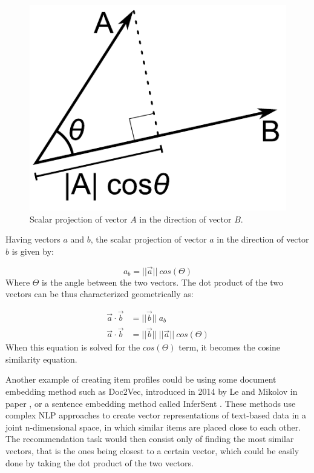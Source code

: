\begin{figure}[H]
    \centering
    \includegraphics[scale=0.8]{obrazky-figures/dot_product.pdf}
    \caption{Scalar projection of vector $A$ in the direction of vector $B$.}
    \label{scalar_projection}
\end{figure}

Having vectors $a$ and $b$, the scalar projection of vector $a$ in the direction of vector $b$ is given by:

\begin{equation}
    a_{b} = ||\Vec{a}|| \ cos(\Theta)
\end{equation}
Where $\Theta$ is the angle between the two vectors. The dot product of the two vectors can be thus characterized geometrically as:

\begin{align}
    \Vec{a} \cdot \Vec{b} & = ||\Vec{b}|| \ a_{b}  \\
    \Vec{a} \cdot \Vec{b} & = ||\Vec{b}|| \ ||\Vec{a}|| \ cos(\Theta)
\end{align}
When this equation is solved for the $cos(\Theta)$ term, it becomes the cosine similarity equation. 

Another example of creating item profiles could be using some document embedding method such as Doc2Vec, introduced in 2014 by Le and Mikolov in paper \cite{Doc2Vec}, or a sentence embedding method called InferSent \cite{InferSent}. These methods use complex NLP approaches to create vector representations of text-based data in a joint n-dimensional space, in which similar items are placed close to each other. The recommendation task would then consist only of finding the most similar vectors, that is the ones being closest to a certain vector, which could be easily done by taking the dot product of the two vectors.


